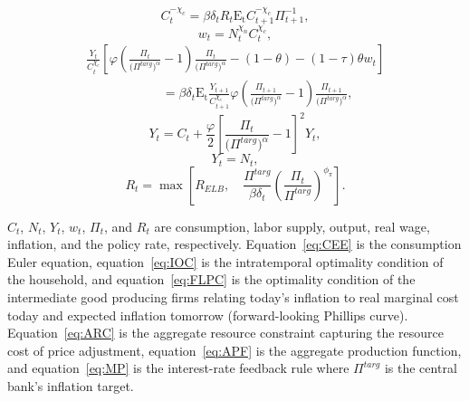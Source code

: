 \documentclass[11pt]{article}
\begin{document}
	\begin{equation}
		C_{t}^{-\chi_{c}} = \beta\delta_{t}R_{t}\mathrm{E_{t}}C_{t+1}^{-\chi_{c}}\Pi_{t+1}^{-1},\label{eq:CEE}
	\end{equation}
	\begin{equation}
		w_{t}=N_{t}^{\chi_{n}}C_{t}^{\chi_{c}},\label{eq:IOC}
	\end{equation}
	\begin{equation}
		\begin{multlined}
			\frac{Y_{t}}{C_{t}^{\chi_{c}}}\left[\varphi \left(\frac{\Pi_{t}}{\bigl(\Pi^{targ}\bigr)^{\alpha}}-1\right)\frac{\Pi_{t}}{\bigl(\Pi^{targ}\bigr)^{\alpha}} - (1-\theta)- (1-\tau)\theta w_{t}\right]\\
			\hspace{6em}= \beta\delta_{t}\mathrm{E_{t}}\frac{Y_{t+1}}{C_{t+1}^{\chi_{c}}}\varphi \left(\frac{\Pi_{t+1}}{\bigl(\Pi^{targ}\bigr)^{\alpha}}-1\right)\frac{\Pi_{t+1}}{\bigl(\Pi^{targ}\bigr)^{\alpha}},\label{eq:FLPC}
		\end{multlined}
	\end{equation}
	\begin{equation}
		Y_{t} = C_{t} + \frac{\varphi}{2}\left[\frac{\Pi_{t}}{\bigl(\Pi^{targ}\bigr)^{\alpha}}-1\right]^{2}Y_{t},\label{eq:ARC}
	\end{equation}
	\begin{equation}
		Y_{t}=N_{t}, \label{eq:APF}
	\end{equation}
	\begin{equation}
		R_{t} = \max \left[R_{ELB}, \quad\frac{\Pi^{targ}}{\beta\delta_t}\left(\frac{\Pi_{t}}{\Pi^{targ}}\right)^{\phi_{\pi}}\right].\label{eq:MP}
	\end{equation}
	
	\noindent $C_{t}$, $N_{t}$, $Y_{t}$, $w_{t}$, $\Pi_{t}$, and $R_{t}$ are consumption, labor supply, output, real  wage, inflation, and the policy rate, respectively. Equation~\ref{eq:CEE} is the consumption Euler equation, equation~\ref{eq:IOC} is the intratemporal optimality condition of the household, and equation~\ref{eq:FLPC} is the optimality condition of the intermediate good producing firms relating today's inflation to real marginal cost today and expected inflation tomorrow (forward-looking Phillips curve). Equation~\ref{eq:ARC} is the aggregate resource constraint capturing the resource cost of price adjustment,  equation~\ref{eq:APF} is the aggregate production function, and equation~\ref{eq:MP} is the interest-rate feedback rule where $\Pi^{targ}$ is the central bank's inflation target.
	
\end{document}

